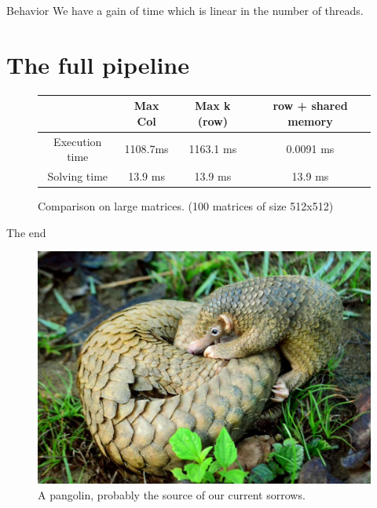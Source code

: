\documentclass[compress,xcolor=table]{beamer}
\begin{document}
\begin{frame}{}

\begin{block}{Behavior}
	We have a gain of time which is linear in the number of threads.
\end{block}
	
\end{frame}

\section{The full pipeline}
\begin{frame}
	\begin{figure}
	\centering
	\begin{tabular}{c|c|c|c}
		& Max Col & Max k (row) & row + shared memory \\
		\hline
		Execution time & 1108.7ms &  1163.1 ms & 0.0091 ms  \\
		Solving time & 13.9 ms & 13.9 ms & 13.9 ms \\		
	\end{tabular}
	
	\caption{Comparison on large matrices. (100 matrices of size 512x512)}
\end{figure}
\end{frame}


\begin{frame}{The end}
	\begin{figure}
		\centering
		\includegraphics[scale=0.25]{images/pangolin.jpg}
		\caption{A pangolin, probably the source of our current sorrows.}
	\end{figure}
\end{frame}
\end{document}
